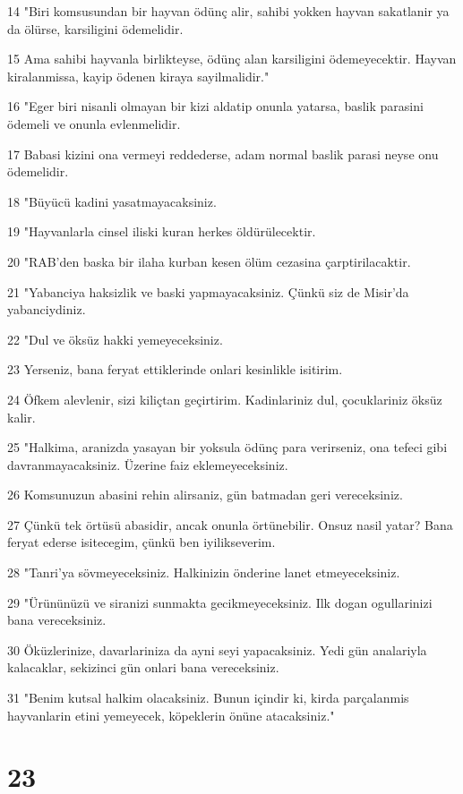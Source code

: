 \par 14 "Biri komsusundan bir hayvan ödünç alir, sahibi yokken hayvan sakatlanir ya da ölürse, karsiligini ödemelidir.
\par 15 Ama sahibi hayvanla birlikteyse, ödünç alan karsiligini ödemeyecektir. Hayvan kiralanmissa, kayip ödenen kiraya sayilmalidir."
\par 16 "Eger biri nisanli olmayan bir kizi aldatip onunla yatarsa, baslik parasini ödemeli ve onunla evlenmelidir.
\par 17 Babasi kizini ona vermeyi reddederse, adam normal baslik parasi neyse onu ödemelidir.
\par 18 "Büyücü kadini yasatmayacaksiniz.
\par 19 "Hayvanlarla cinsel iliski kuran herkes öldürülecektir.
\par 20 "RAB'den baska bir ilaha kurban kesen ölüm cezasina çarptirilacaktir.
\par 21 "Yabanciya haksizlik ve baski yapmayacaksiniz. Çünkü siz de Misir'da yabanciydiniz.
\par 22 "Dul ve öksüz hakki yemeyeceksiniz.
\par 23 Yerseniz, bana feryat ettiklerinde onlari kesinlikle isitirim.
\par 24 Öfkem alevlenir, sizi kiliçtan geçirtirim. Kadinlariniz dul, çocuklariniz öksüz kalir.
\par 25 "Halkima, aranizda yasayan bir yoksula ödünç para verirseniz, ona tefeci gibi davranmayacaksiniz. Üzerine faiz eklemeyeceksiniz.
\par 26 Komsunuzun abasini rehin alirsaniz, gün batmadan geri vereceksiniz.
\par 27 Çünkü tek örtüsü abasidir, ancak onunla örtünebilir. Onsuz nasil yatar? Bana feryat ederse isitecegim, çünkü ben iyilikseverim.
\par 28 "Tanri'ya sövmeyeceksiniz. Halkinizin önderine lanet etmeyeceksiniz.
\par 29 "Ürününüzü ve siranizi sunmakta gecikmeyeceksiniz. Ilk dogan ogullarinizi bana vereceksiniz.
\par 30 Öküzlerinize, davarlariniza da ayni seyi yapacaksiniz. Yedi gün analariyla kalacaklar, sekizinci gün onlari bana vereceksiniz.
\par 31 "Benim kutsal halkim olacaksiniz. Bunun içindir ki, kirda parçalanmis hayvanlarin etini yemeyecek, köpeklerin önüne atacaksiniz."

\chapter{23}

